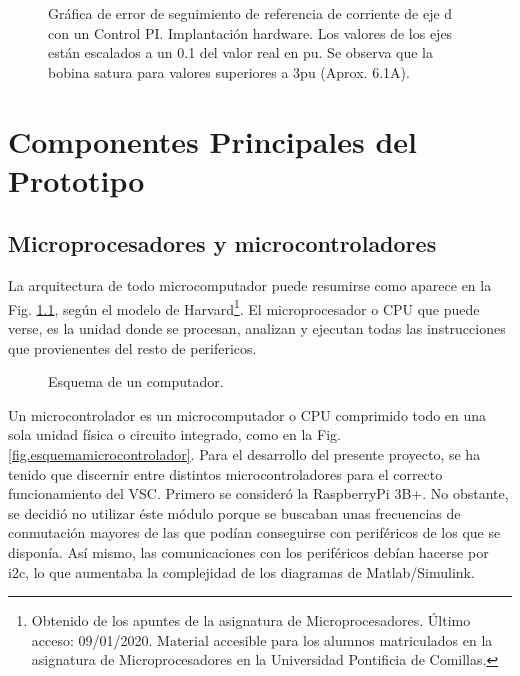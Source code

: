 \documentclass{report}
\begin{document}
\begin{figure}[!h]
    \centering
    \caption{Gráfica de error de seguimiento de referencia de corriente de eje d con un Control PI. Implantación hardware. Los valores de los ejes están escalados a un 0.1 del valor real en pu. Se observa que la bobina satura para valores superiores a 3pu (Aprox. 6.1A).}
    \label{fig.excelcontrolPI}
\end{figure} 


\clearpage

\chapter{Componentes Principales del Prototipo} \label{sec.componentesprincipales}




\section{Microprocesadores y microcontroladores} \label{sec.microcontroladores}

La arquitectura de todo microcomputador puede resumirse como aparece en la Fig. \ref{fig.esquemaarquitecturaordenador}, según el modelo de Harvard\footnote{Obtenido de los apuntes de la asignatura de Microprocesadores. Último acceso: 09/01/2020. Material accesible para los alumnos matriculados en la asignatura de Microprocesadores en la Universidad Pontificia de Comillas.}. El microprocesador o CPU que puede verse, es la unidad donde se procesan, analizan y ejecutan todas las instrucciones que provienentes del resto de perifericos.

\begin{figure}[!h]
    \begin{center}
        
\end{center}

\caption{Esquema de un computador.}

\label{fig.esquemaarquitecturaordenador}
\end{figure}

Un microcontrolador es un microcomputador o CPU comprimido todo en una sola unidad física o circuito integrado, como en la Fig. \ref{fig.esquemamicrocontrolador}. Para el desarrollo del presente proyecto, se ha tenido que discernir entre distintos microcontroladores para el correcto funcionamiento del VSC. Primero se consideró la RaspberryPi 3B+. No obstante, se decidió no utilizar éste módulo porque se buscaban unas frecuencias de conmutación mayores de las que podían conseguirse con periféricos de los que se disponía. Así mismo, las comunicaciones con los periféricos debían hacerse por i2c, lo que aumentaba la complejidad de los diagramas de Matlab/Simulink.
\end{document}
